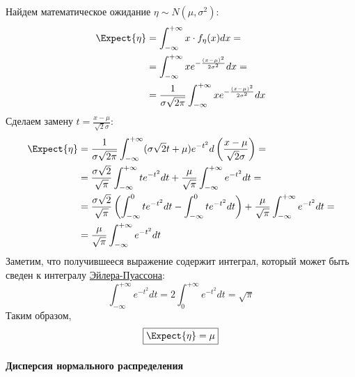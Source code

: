 Найдем математическое ожидание \(\eta \sim N(\mu, \sigma^2)\):
\[\begin{aligned}
    \Expect{\eta} &= \int_{-\infty}^{+\infty} x \cdot f_\eta(x)dx =\\
                  &= \int_{-\infty}^{+\infty} xe^{-\frac{(x-\mu)^2}{2\sigma^2}}dx =\\
                  &= \frac{1}{\sigma\sqrt{2\pi}} \int_{-\infty}^{+\infty} xe^{-\frac{(x-\mu)^2}{2\sigma^2}}dx
\end{aligned}\] Сделаем замену \(t = \frac{x-\mu}{\sqrt{2}\sigma}\):
\[\begin{aligned}
    \Expect{\eta} &= \frac{1}{\sigma\sqrt{2\pi}} \int_{-\infty}^{+\infty}(\sigma\sqrt{2}t + \mu)
                    e^{-t^2} d\left(\frac{x-\mu}{\sqrt{2}\sigma}\right) =\\
                  &= \frac{\sigma\sqrt{2}}{\sqrt{\pi}}\int_{-\infty}^{+\infty}te^{-t^2}dt
                    + \frac{\mu}{\sqrt{\pi}}\int_{-\infty}^{+\infty}e^{-t^2}dt =\\
                  &= \frac{\sigma\sqrt{2}}{\sqrt{\pi}}\left(\int_{-\infty}^{0}te^{-t^2}dt
                    - \int_{-\infty}^{0}te^{-t^2}dt\right) + \frac{\mu}{\sqrt{\pi}}\int_{-\infty}^{+\infty}e^{-t^2}dt =\\
                  &= \frac{\mu}{\sqrt{\pi}}\int_{-\infty}^{+\infty}e^{-t^2}dt
\end{aligned}\] Заметим, что получившееся выражение содержит интеграл,
который может быть сведен к интегралу
\href{https://ru.wikipedia.org/wiki/Гауссов_интеграл}{Эйлера-Пуассона}:
\[\int_{-\infty}^{+\infty}e^{-t^2}dt = 2\int_{0}^{+\infty}e^{-t^2}dt = \sqrt{\pi}\]
Таким образом, \[\boxed{
    \Expect{\eta} = \mu
}\]

\hypertarget{ux434ux438ux441ux43fux435ux440ux441ux438ux44f-ux43dux43eux440ux43cux430ux43bux44cux43dux43eux433ux43e-ux440ux430ux441ux43fux440ux435ux434ux435ux43bux435ux43dux438ux44f}{%
\paragraph{Дисперсия нормального
распределения}\label{ux434ux438ux441ux43fux435ux440ux441ux438ux44f-ux43dux43eux440ux43cux430ux43bux44cux43dux43eux433ux43e-ux440ux430ux441ux43fux440ux435ux434ux435ux43bux435ux43dux438ux44f}}

